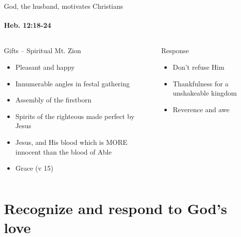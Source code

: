 \begin{frame}{God, the  husband, motivates Christians}
\framesubtitle{Heb. 12:18-24}
\begin{columns}[T]
\begin{column}{0.5\textwidth}
	Gifts -- Spiritual Mt. Zion
    \begin{itemize}
      \item Pleasant and happy
      \item Innumerable angles in festal gathering
      \item Assembly of the firstborn
      \item Spirits of the righteous made perfect by Jesus
      \item Jesus, and His blood which is MORE innocent than the blood of Able
      \item Grace (v 15)
		\end{itemize}
\end{column}
\begin{column}{0.5\textwidth}
	Response
	\begin{itemize}
			\item Don't refuse Him
      \item Thankfulness for a unshakeable kingdom
      \item Reverence and awe
		\end{itemize}
\end{column}
\end{columns}

\end{frame}

\section{Recognize and respond to God's love}

